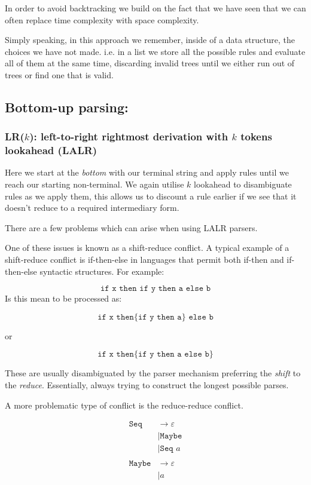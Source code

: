 \documentclass{article}
\renewcommand{\i}[1]{\textit{#1}}
\begin{document}
In order to avoid backtracking we build on the fact that we have seen that we can often replace time complexity with space complexity.

Simply speaking, in this approach we remember, inside of a data structure, the choices we have not made. i.e. in a list we store all the possible rules and evaluate all of them at the same time, discarding invalid trees until we either run out of trees or find one that is valid.
\subsection{Bottom-up parsing:}
\subsubsection{LR($k$): left-to-right rightmost derivation with $k$ tokens lookahead (LALR)}

Here we start at the \i{bottom} with our terminal string and apply rules until we reach our starting non-terminal. We again utilise $k$ lookahead to disambiguate rules as we apply them, this allows us to discount a rule earlier if we see that it doesn't reduce to a required intermediary form.

There are a few problems which can arise when using LALR parsers. 

One of these issues is known as a shift-reduce conflict. A typical example of a shift-reduce conflict is if-then-else in languages that permit both if-then and if-then-else syntactic structures. For example:

$$
\texttt{if x then if y then a else b}
$$
Is this mean to be processed as:

$$
\texttt{if x then} \{ \texttt{if y then a}\}\texttt{ else b}
$$

or 

$$
\texttt{if x then} \{\texttt{if y then a else b}\}
$$

These are usually disambiguated by the parser mechanism preferring the \i{shift} to the \i{reduce}. Essentially, always trying to construct the longest possible parses.

A more problematic type of conflict is the reduce-reduce conflict.

\begin{align*}
    \texttt{Seq} &\rightarrow \varepsilon \\
        &| \texttt{Maybe} \\
        &| \texttt{Seq }a \\
        \\
    \texttt{Maybe} &\rightarrow \varepsilon \\
          &| a
\end{align*}
\end{document}
